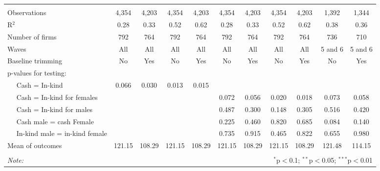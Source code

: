 \documentclass{report}
\begin{document}
\begin{table}[!htbp]
\begin{tabular}{@{\extracolsep{5pt}}lcccccccccc}
  & & & & & & & & & & \\ 
\hline \\[-1.8ex] 
Observations & 4,354 & 4,203 & 4,354 & 4,203 & 4,354 & 4,203 & 4,354 & 4,203 & 1,392 & 1,344 \\ 
R$^{2}$ & 0.28 & 0.33 & 0.52 & 0.62 & 0.28 & 0.33 & 0.52 & 0.62 & 0.38 & 0.36 \\ 
Number of firms & 792 & 764 & 792 & 764 & 792 & 764 & 792 & 764 & 736 & 710 \\ 
Waves & All & All & All & All & All & All & All & All & 5 and 6 & 5 and 6 \\ 
Baseline trimming & No & Yes & No & Yes & No & Yes & No & Yes & No & Yes \\ 
p-values for testing: &  &  &  &  &  &  &  &  &  &  \\ 
$\quad$  Cash = In-kind & 0.066 & 0.030 & 0.013 & 0.015 &  &  &  &  &  &  \\ 
$\quad$  Cash = In-kind for females &  &  &  &  & 0.072 & 0.056 & 0.020 & 0.018 & 0.073 & 0.058 \\ 
$\quad$  Cash = In-kind for males &  &  &  &  & 0.487 & 0.300 & 0.148 & 0.305 & 0.516 & 0.420 \\ 
$\quad$  Cash male = cash Female &  &  &  &  & 0.225 & 0.460 & 0.820 & 0.685 & 0.084 & 0.140 \\ 
$\quad$  In-kind male = in-kind female &  &  &  &  & 0.735 & 0.915 & 0.465 & 0.822 & 0.655 & 0.980 \\ 
Mean of outcomes & 121.15 & 108.29 & 121.15 & 108.29 & 121.15 & 108.29 & 121.15 & 108.29 & 121.48 & 114.15 \\ 
\hline \\[-1.8ex] 
\textit{Note:}  & \multicolumn{10}{r}{$^{*}$p$<$0.1; $^{**}$p$<$0.05; $^{***}$p$<$0.01} \\ 
\end{tabular} 
\end{table} 
\end{document}
